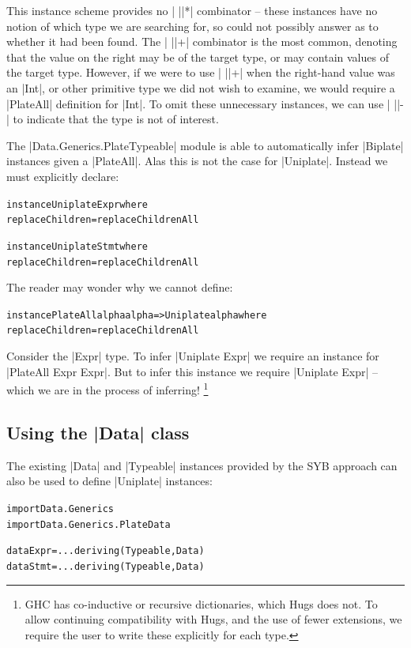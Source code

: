 \documentclass[preprint]{sigplanconf}
\newenvironment{code}{\begin{alltt}\small}{\end{alltt}}
\newcommand{\ignore}{}
\begin{document}
This instance scheme provides no | ||*| combinator -- these instances have no notion of which type we are searching for, so could not possibly answer as to whether it had been found. The | ||+| combinator is the most common, denoting that the value on the right may be of the target type, or may contain values of the target type. However, if we were to use | ||+| when the right-hand value was an |Int|, or other primitive type we did not wish to examine, we would require a |PlateAll| definition for |Int|. To omit these unnecessary instances, we can use | ||-| to indicate that the type is not of interest.

The |Data.Generics.PlateTypeable| module is able to automatically infer |Biplate| instances given a |PlateAll|. Alas this is not the case for |Uniplate|. Instead we must explicitly declare:

\begin{code}
instance Uniplate Expr where
    replaceChildren = replaceChildrenAll

instance Uniplate Stmt where
    replaceChildren = replaceChildrenAll
\end{code}

The reader may wonder why we cannot define:

\begin{code}
instance PlateAll alpha alpha => Uniplate alpha where
    replaceChildren = replaceChildrenAll
\end{code}

Consider the |Expr| type. To infer \ignore|Uniplate Expr| we require an instance for \ignore|PlateAll Expr Expr|. But to infer this instance we require \ignore|Uniplate Expr| -- which we are in the process of inferring! \footnote{GHC has co-inductive or recursive dictionaries, which Hugs does not. To allow continuing compatibility with Hugs, and the use of fewer extensions, we require the user to write these explicitly for each type.}


\subsection{Using the |Data| class}
\label{sec:implement_playdata}

The existing |Data| and |Typeable| instances provided by the SYB approach can also be used to define |Uniplate| instances:

\ignore\begin{code}
import Data.Generics
import Data.Generics.PlateData

data Expr  = ... \? \? deriving (Typeable, Data)
data Stmt  = ... \? \? deriving (Typeable, Data)
\end{code}
\end{document}
